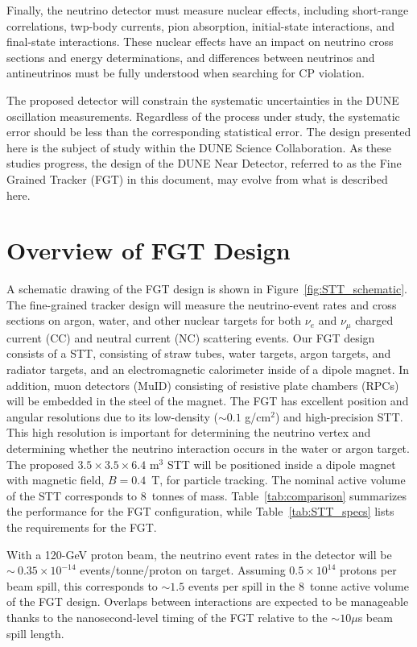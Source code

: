 Finally, the neutrino detector must measure nuclear effects, including
short-range correlations, twp-body currents, pion absorption, initial-state interactions, 
and final-state interactions. These nuclear effects 
have an impact on neutrino cross sections and energy determinations, and differences
between neutrinos and antineutrinos must be fully understood when searching
for CP violation.

The proposed detector will constrain the systematic uncertainties in the DUNE 
oscillation measurements. Regardless of the process under study, the 
systematic error should be less than the corresponding statistical error. 
The design presented here is the subject of study within the DUNE Science 
Collaboration. As these studies 
progress, the design of the DUNE Near Detector, 
referred to as the Fine Grained Tracker (FGT) in this document, may 
evolve from what is described here. 

\section{Overview of FGT Design}
\label{sec:nd-nnd-fgt}

A schematic drawing of the 
FGT design is shown in Figure~\ref{fig:STT_schematic}. 
The fine-grained tracker 
design will measure the neutrino-event rates and cross sections 
on argon, water, and other nuclear 
targets for both $\nu_e$ and $\nu_\mu$ charged current (CC) and
neutral current (NC) scattering events. Our FGT design 
consists of a STT, consisting of straw tubes, water targets, argon targets, 
and radiator targets, and an electromagnetic calorimeter inside of a
dipole magnet. In addition, muon detectors (MuID) consisting of resistive plate
chambers (RPCs) will be embedded in the steel
of the magnet. The FGT has excellent position and angular resolutions due to
its low-density ($\sim 0.1$ g/cm$^2$) and high-precision STT. This high 
resolution is important for determining the neutrino
vertex and determining whether the neutrino interaction occurs in the water
or argon target.  The
proposed $3.5\times3.5\times6.4$ m$^3$ STT will be positioned inside a 
dipole magnet with magnetic field, $B = 0.4$~T, for particle tracking.
The nominal active volume of the STT corresponds to 8~tonnes of mass.
Table~\ref{tab:comparison} summarizes the
performance for the FGT configuration, while
Table~\ref{tab:STT_specs} lists the requirements for the FGT.

With a 120-GeV proton beam, the neutrino event rates in the detector
will be $\sim~0.35\times 10^{-14}$ events/tonne/proton on target.
Assuming $0.5\times 10^{14}$ protons per beam spill, this corresponds
to $\sim 1.5$ events per spill in the 8~tonne active volume of the FGT
design.  Overlaps between interactions are expected to be
manageable thanks to the nanosecond-level timing of the FGT relative to
the $\sim 10 \mu$s beam spill length.

